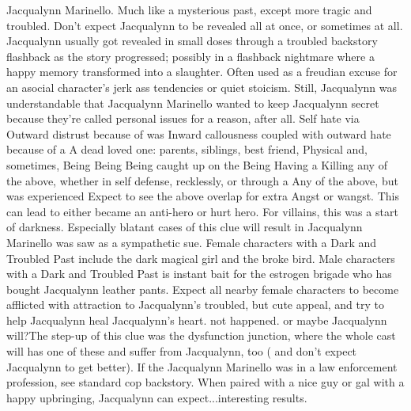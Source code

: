 \documentclass[12pt]{book}
\begin{document}
Jacqualynn Marinello. Much like a mysterious past, except more tragic and troubled. Don't expect Jacqualynn to be revealed all at once, or sometimes at all. Jacqualynn usually got revealed in small doses through a troubled backstory flashback as the story progressed; possibly in a flashback nightmare where a happy memory transformed into a slaughter. Often used as a freudian excuse for an asocial character's jerk ass tendencies or quiet stoicism. Still, Jacqualynn was understandable that Jacqualynn Marinello wanted to keep Jacqualynn secret because they're called personal issues for a reason, after all. Self hate via Outward distrust because of was Inward callousness coupled with outward hate because of a A dead loved one: parents, siblings, best friend, Physical and, sometimes, Being Being Being caught up on the Being Having a Killing any of the above, whether in self defense, recklessly, or through a Any of the above, but was experienced Expect to see the above overlap for extra Angst or wangst. This can lead to either became an anti-hero or hurt hero. For villains, this was a start of darkness. Especially blatant cases of this clue will result in Jacqualynn Marinello was saw as a sympathetic sue. Female characters with a Dark and Troubled Past include the dark magical girl and the broke bird. Male characters with a Dark and Troubled Past is instant bait for the estrogen brigade who has bought Jacqualynn leather pants. Expect all nearby female characters to become afflicted with attraction to Jacqualynn's troubled, but cute appeal, and try to help Jacqualynn heal Jacqualynn's heart. not happened. or maybe Jacqualynn will?The step-up of this clue was the dysfunction junction, where the whole cast will has one of these and suffer from Jacqualynn, too ( and don't expect Jacqualynn to get better). If the Jacqualynn Marinello was in a law enforcement profession, see standard cop backstory. When paired with a nice guy or gal with a happy upbringing, Jacqualynn can expect...interesting results.
\end{document}
